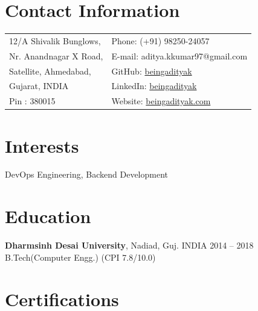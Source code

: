 \documentclass[margin,line]{res}
\begin{document}
 \hfill
{}

\begin{resume}
\section{\sc Contact Information}

\vspace{.05in}
\begin{tabular}{@{}p{3.5in}p{3in}}
12/A Shivalik Bunglows, & {Phone:}  (+91) 98250-24057 \\
Nr. Anandnagar X Road,  & {E-mail:}  aditya.kkumar97@gmail.com\\
Satellite, Ahmedabad,  & {GitHub:} \href{https://github.com/beingadityak}{beingadityak}\\
Gujarat, INDIA  & {LinkedIn:} \href{https://www.linkedin.com/in/beingadityak}{beingadityak}\\
Pin : 380015 & {Website:} \url{beingadityak.com}
\end{tabular}


\section{\sc Interests}

DevOps Engineering, Backend Development

\section{\sc Education}
{\bf Dharmsinh Desai University}, Nadiad, Guj. INDIA \hfill 2014 -- 2018\\
B.Tech(Computer Engg.) \hfill(CPI 7.8/10.0)

\section{\sc Certifications}


\end{resume}
\end{document}
